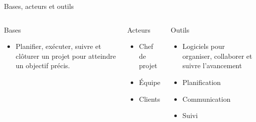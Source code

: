 \documentclass{beamer}
\begin{document}
\begin{frame}{\color{mygreen}Bases, acteurs et outils}
  \scriptsize
  \begin{columns}
    {
    \begin{block}{Bases}
      \begin{itemize}
        \item Planifier, exécuter, suivre et clôturer un projet pour atteindre un objectif précis.
      \end{itemize}
    \end{block}}
    {
    \begin{block}{Acteurs}
      \begin{itemize}
        \item Chef de projet
        \item Équipe
        \item Clients
      \end{itemize}
    \end{block}}
    {
    \begin{block}{Outils}
      \begin{itemize}
        \item Logiciels pour organiser, collaborer et suivre l’avancement
        \item Planification
        \item Communication
        \item Suivi
      \end{itemize}
    \end{block}}
  \end{columns}
\end{frame}
\end{document}
